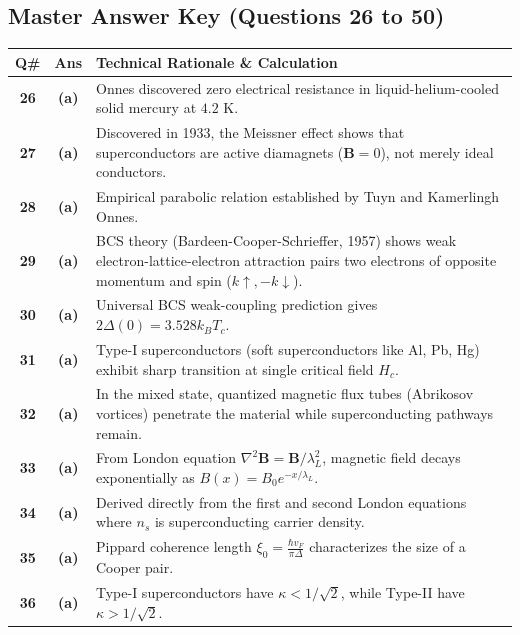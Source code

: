 \subsection*{Master Answer Key (Questions 26 to 50)}

{\small
\noindent\begin{tabularx}{\textwidth}{|c|c|X|}
\hline
\textbf{Q\#} & \textbf{Ans} & \textbf{Technical Rationale \& Calculation} \\
\hline
\textbf{26} & \textbf{(a)} & Onnes discovered zero electrical resistance in liquid-helium-cooled solid mercury at $4.2\text{ K}$. \\ \hline
\textbf{27} & \textbf{(a)} & Discovered in 1933, the Meissner effect shows that superconductors are active diamagnets ($\mathbf{B}=0$), not merely ideal conductors. \\ \hline
\textbf{28} & \textbf{(a)} & Empirical parabolic relation established by Tuyn and Kamerlingh Onnes. \\ \hline
\textbf{29} & \textbf{(a)} & BCS theory (Bardeen-Cooper-Schrieffer, 1957) shows weak electron-lattice-electron attraction pairs two electrons of opposite momentum and spin ($k\uparrow, -k\downarrow$). \\ \hline
\textbf{30} & \textbf{(a)} & Universal BCS weak-coupling prediction gives $2\Delta(0) = 3.528 k_B T_c$. \\ \hline
\textbf{31} & \textbf{(a)} & Type-I superconductors (soft superconductors like Al, Pb, Hg) exhibit sharp transition at single critical field $H_c$. \\ \hline
\textbf{32} & \textbf{(a)} & In the mixed state, quantized magnetic flux tubes (Abrikosov vortices) penetrate the material while superconducting pathways remain. \\ \hline
\textbf{33} & \textbf{(a)} & From London equation $\nabla^2 \mathbf{B} = \mathbf{B}/\lambda_L^2$, magnetic field decays exponentially as $B(x) = B_0 e^{-x/\lambda_L}$. \\ \hline
\textbf{34} & \textbf{(a)} & Derived directly from the first and second London equations where $n_s$ is superconducting carrier density. \\ \hline
\textbf{35} & \textbf{(a)} & Pippard coherence length $\xi_0 = \frac{\hbar v_F}{\pi \Delta}$ characterizes the size of a Cooper pair. \\ \hline
\textbf{36} & \textbf{(a)} & Type-I superconductors have $\kappa < 1/\sqrt{2}$, while Type-II have $\kappa > 1/\sqrt{2}$. \\ \hline

\end{tabularx}}

